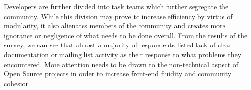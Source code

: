 \noindent Developers are further divided into task teams which further segregate the community. While this division may prove to increase efficiency by virtue of modularity, it also alienates members of the community and creates more ignorance or negligence of what needs to be done overall. From the results of the survey, we can see that almost a majority of respondents listed lack of clear documentation or mailing list activity as their response to what problems they encountered. More attention needs to be drawn to the non-technical aspect of Open Source projects in order to increase front-end fluidity and community cohesion.
